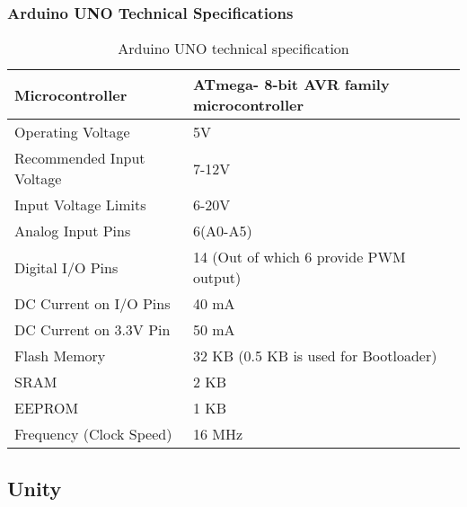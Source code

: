 \documentclass[12pt,a4paper]{article}
\begin{document}
\begin{center}
\begin{center}
\subsubsection*{Arduino UNO Technical Specifications}
\begin{table}[H]
	\caption{Arduino UNO technical specification}
	\vspace{0.3cm}
	\begin{tabular}{|l|l|}
		\hline
		\textbf {Microcontroller}  & \textbf{ATmega- 8-bit AVR family microcontroller}\\
		\hline
		Operating Voltage & 5V \\ 
		\hline
		Recommended Input Voltage &7-12V\\	
		\hline
		Input Voltage Limits &  6-20V \\
		Analog Input Pins & 6(A0-A5)\\
		\hline
		Digital I/O Pins & 14 (Out of which 6 provide PWM output)\\
		\hline
     	DC Current on I/O Pins &  40 mA \\
		\hline
	    DC Current on 3.3V Pin &  50 mA \\
		\hline
		Flash Memory &  32 KB (0.5 KB is used for Bootloader)\\
		\hline
		SRAM &  2 KB \\
		\hline
    	EEPROM &  1 KB \\
		\hline
		Frequency (Clock Speed) &16 MHz\\
		\hline
	
\end{tabular}
\end{table}	
\subsection{Unity}


\end{center}
\end{center}
\end{document}
